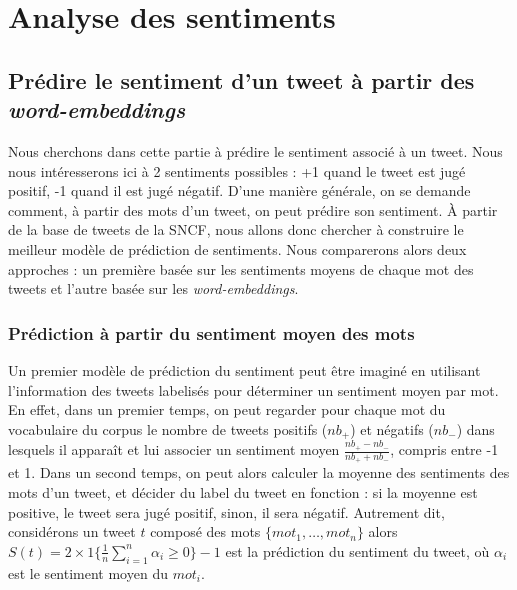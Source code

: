 \documentclass[11pt,french,french]{article}
\begin{document}
\section{Analyse des sentiments}\label{sec:sentimentalAnalysis}

\subsection{\texorpdfstring{Prédire le sentiment d'un tweet à partir des
\emph{word-embeddings}}{Prédire le sentiment d'un tweet à partir des word-embeddings}}\label{pruxe9dire-le-sentiment-dun-tweet-uxe0-partir-des-word-embeddings}

Nous cherchons dans cette partie à prédire le sentiment associé à un
tweet. Nous nous intéresserons ici à 2 sentiments possibles : +1 quand
le tweet est jugé positif, -1 quand il est jugé négatif. D'une manière
générale, on se demande comment, à partir des mots d'un tweet, on peut
prédire son sentiment. À partir de la base de tweets de la SNCF, nous
allons donc chercher à construire le meilleur modèle de prédiction de
sentiments. Nous comparerons alors deux approches : un première basée
sur les sentiments moyens de chaque mot des tweets et l'autre basée sur
les \emph{word-embeddings}.

\subsubsection{Prédiction à partir du sentiment moyen des
mots}\label{pruxe9diction-uxe0-partir-du-sentiment-moyen-des-mots}

Un premier modèle de prédiction du sentiment peut être imaginé en
utilisant l'information des tweets labelisés pour déterminer un
sentiment moyen par mot. En effet, dans un premier temps, on peut
regarder pour chaque mot du vocabulaire du corpus le nombre de tweets
positifs (\(nb_+\)) et négatifs (\(nb_-\)) dans lesquels il apparaît et
lui associer un sentiment moyen \(\frac{nb_+ - nb_-}{nb_+ + nb_-}\),
compris entre -1 et 1. Dans un second temps, on peut alors calculer la
moyenne des sentiments des mots d'un tweet, et décider du label du tweet
en fonction : si la moyenne est positive, le tweet sera jugé positif,
sinon, il sera négatif. Autrement dit, considérons un tweet \(t\)
composé des mots \(\{ mot_1 , \dots , mot_n \}\) alors
\(S(t) = 2 \times 1\{ \frac{1}{n} \sum \limits_{i=1}^n \alpha_i \geq 0\} - 1\)
est la prédiction du sentiment du tweet, où \(\alpha_i\) est le
sentiment moyen du \(mot_i\).
\end{document}
